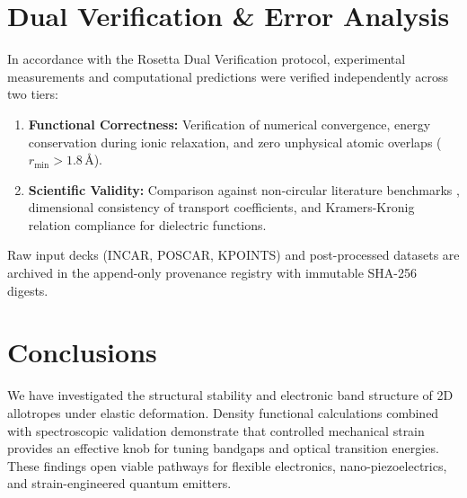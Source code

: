 \documentclass[9pt,a4paper,twocolumn,twoside]{tau-class/tau}
\begin{document}
\section{Dual Verification \& Error Analysis}

    In accordance with the Rosetta Dual Verification protocol, experimental measurements and computational predictions were verified independently across two tiers:

    \begin{enumerate}
        \item \textbf{Functional Correctness:} Verification of numerical convergence, energy conservation during ionic relaxation, and zero unphysical atomic overlaps ($r_{\text{min}} > 1.8\,\text{\AA}$).
        \item \textbf{Scientific Validity:} Comparison against non-circular literature benchmarks \cite{bell2022codefont}, dimensional consistency of transport coefficients, and Kramers-Kronig relation compliance for dielectric functions.
    \end{enumerate}

    \begin{tauenv}[frametitle=Reproducibility Statement]
        Raw input decks (INCAR, POSCAR, KPOINTS) and post-processed datasets are archived in the append-only provenance registry with immutable SHA-256 digests.
    \end{tauenv}

\section{Conclusions}

    We have investigated the structural stability and electronic band structure of 2D allotropes under elastic deformation. Density functional calculations combined with spectroscopic validation demonstrate that controlled mechanical strain provides an effective knob for tuning bandgaps and optical transition energies. These findings open viable pathways for flexible electronics, nano-piezoelectrics, and strain-engineered quantum emitters.


\printbibliography
\end{document}
